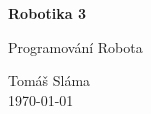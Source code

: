 \documentclass[11pt]{article}
\begin{document}
\begin{titlepage}
    \begin{center}
        \vspace*{1cm}
            
        \Huge
        \textbf{Robotika 3}
            
        \vspace{0.5cm}
        \LARGE
				Programování Robota
        
        \vspace{1.5cm}
        
        \vfill
        \flushright
        \normalsize
				Tomáš Sláma\\
				\today
        
    \end{center}
\end{titlepage}

\tableofcontents
\clearpage









\end{document}
